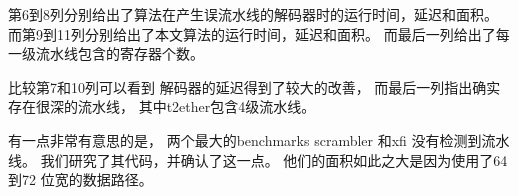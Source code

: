 第6到8列分别给出了算法在产生误流水线的解码器时的运行时间，延迟和面积。
而第9到11列分别给出了本文算法的运行时间，延迟和面积。
而最后一列给出了每一级流水线包含的寄存器个数。

比较第7和10列可以看到
解码器的延迟得到了较大的改善，
而最后一列指出确实存在很深的流水线，
其中t2ether包含4级流水线。

有一点非常有意思的是，
两个最大的benchmarks scrambler 和xfi 没有检测到流水线。
我们研究了其代码，并确认了这一点。
他们的面积如此之大是因为使用了64 到72 位宽的数据路径。

%
%
%


%
%
%

